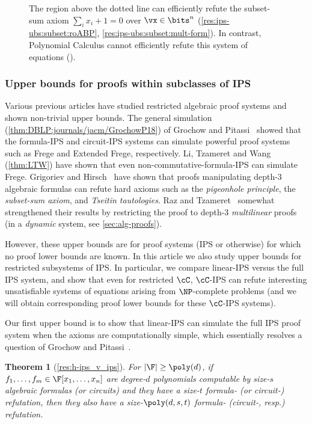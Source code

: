 \documentclass[11pt]{article}
\numberwithin{equation}{section}
\newtheorem{theorem}{Theorem}[section]
\theoremstyle{definition}
\theoremstyle{plain}
\begin{document}
\begin{figure}
{\begin{enumerate*}[(a)]
                                \label{fig:results:lbs}
                        \item The region above the dotted line can efficiently refute the subset-sum axiom $\sum_i x_i+1=0$ over $\vx\in\bits^n$ (\autoref{res:ips-ubs:subset:roABP}, \autoref{res:ips-ubs:subset:mult-form}). In contrast, Polynomial Calculus cannot efficiently refute this system of equations (\cite{IPS99}).
                                \label{fig:results:ubs}
                \end{enumerate*}
        }
\end{figure}

\subsubsection{Upper bounds for proofs within subclasses of IPS}\label{sec:results:upper}

Various previous %
%
%
%
%
articles %
%
%
have studied restricted algebraic proof systems and shown non-trivial upper bounds.  The general simulation (\autoref{thm:DBLP:journals/jacm/GrochowP18}) of Grochow and Pitassi~\cite{DBLP:journals/jacm/GrochowP18} showed that the formula-IPS and circuit-IPS systems can simulate powerful proof systems such as Frege and Extended Frege, respectively.  %
%
%
%
Li, Tzameret and Wang~\cite{LiTW15} (\autoref{thm:LTW})
%
have shown  %
%
that even non-commutative-formula-IPS can simulate Frege.
Grigoriev and Hirsch~\cite{GrigorievHirsch03}
%
have shown   %
that proofs manipulating depth-3 algebraic formulas can refute hard axioms such as the \emph{pigeonhole principle}, the \emph{subset-sum axiom}, and \emph{Tseitin tautologies}.
Raz and Tzameret~\cite{RazTzameret08a,RazTzameret08b} somewhat strengthened their results by restricting the proof to depth-3 \emph{multilinear} proofs (in a \emph{dynamic} system, see \autoref{sec:alg-proofs}).

However, these upper bounds are for proof systems (IPS or otherwise) for which no proof lower bounds are known.  In this article
we also study upper bounds for restricted subsystems of IPS.  In particular, we compare linear-IPS versus the full IPS system, and show
that even for restricted $\cC$, $\cC$-IPS can refute interesting unsatisfiable systems of equations arising from $\NP$-complete problems (and we will obtain corresponding proof lower bounds for these $\cC$-IPS systems).

Our first upper bound is to show that linear-IPS can simulate the full IPS proof system when the axioms are computationally simple, which essentially resolves a question of Grochow and Pitassi~\cite[Open Question 1.13\footnote{This refers to the following version: \url{http://arxiv.org/abs/1404.3820v1}.}]{DBLP:journals/jacm/GrochowP18}.
\begin{theorem}[\autoref{res:h-ips_v_ips}]
  For $|\F|\ge\poly(d)$, if $f_1,\ldots,f_m\in\F[x_1,\ldots,x_n]$ are degree-$d$ polynomials computable by size-$s$ algebraic formulas
%
(or circuits)  %
and they have a size-$t$ formula-\IPS
%
(or circuit-\IPS)  %
refutation, then they also have a size-$\poly(d,s,t)$ formula-\lIPS
%
(circuit-\lIPS, resp.)
refutation.
\end{theorem}
%
%
%
%
%
\end{document}
